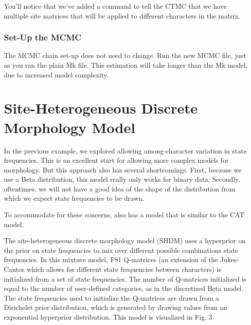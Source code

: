 You'll notice that we've added a command to tell the CTMC that we have multiple site matrices that will be applied to different characters in the matrix.

\medskip
\subsubsection{Set-Up the MCMC}

The MCMC chain set-up does not need to change. 
Run the new MCMC file, just as you ran the plain Mk file.
This estimation will take longer than the Mk model, due to increased model complexity. \par


\section{Site-Heterogeneous Discrete Morphology Model} \label{sec:dm_dir}

\begin{figure}[h!]
\label{fig:module-relaxed morphology}
\end{figure}

In the previous example, we explored allowing among-character variation in state frequencies.
This is an excellent start for allowing more complex models for morphology.
But this approach also has several shortcomings.
First, because we use a Beta distribution, this model really only works for binary data.
Secondly, oftentimes, we will not have a good idea of the shape of the distribution from which we expect state frequencies to be drawn. \par
To accommodate for these concerns,  also has a model that is similar to the CAT model. \par
The site-heterogeneous discrete morphology model (SHDM) uses a hyperprior on the prior on state frequencies to mix over different possible combinations state frequencies.
In this mixture model, F81 Q-matrices (an extension of the Jukes-Cantor which allows for different state frequencies between characters) is initialized from a set of state frequencies.
The number of Q-matrices initialized is equal to the number of user-defined categories, as in the discretized Beta model.
The state frequencies used to initialize the Q-matrices are drawn from a Dirichelet prior distribution, which is generated by drawing values from an exponential hyperprior distribution. 
This model is visualized in Fig. 3.\par

